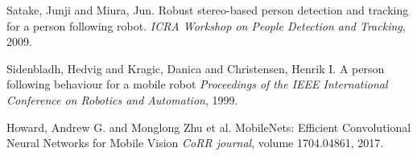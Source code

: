 \documentclass{svproc}
\begin{document}
\begin{thebibliography}{6}
Satake, Junji and Miura, Jun.
Robust stereo-based person detection and tracking for a person following robot.
\textit{ICRA Workshop on People Detection and Tracking}, 2009.


Sidenbladh, Hedvig and Kragic, Danica and Christensen, Henrik I.
A person following behaviour for a mobile robot
\textit{Proceedings of the IEEE International Conference on Robotics and Automation}, 1999. 

Howard, Andrew G. and Monglong Zhu et al.
MobileNets: Efficient Convolutional Neural Networks for Mobile Vision
\textit{CoRR journal}, volume 1704.04861, 2017.

\end{thebibliography}
\end{document}
